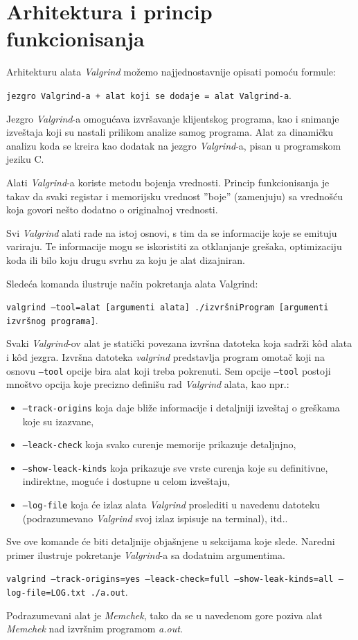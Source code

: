 \documentclass[12pt,oneside]{memoir}
\theoremstyle{plain}
\theoremstyle{definition}
\begin{document}
\section{Arhitektura i princip funkcionisanja}
Arhitekturu alata \textit{Valgrind} možemo najjednostavnije opisati pomoću formule:
\begin{center}
\texttt{jezgro Valgrind-a + alat koji se dodaje = alat Valgrind-a}.
\end{center}

Jezgro \textit{Valgrind}-a omogućava izvršavanje klijentskog programa, kao i snimanje izveštaja koji su nastali prilikom analize samog programa. Alat za dinamičku analizu koda se kreira kao dodatak na jezgro \textit{Valgrind}-a, pisan u programskom jeziku C.

Alati \textit{Valgrind}-a koriste metodu bojenja vrednosti. Princip funkcionisanja je takav da svaki registar i memorijsku vrednost ''boje'' (zamenjuju) sa vrednošću koja govori nešto dodatno o originalnoj vrednosti.

Svi \textit{Valgrind} alati rade na istoj osnovi, s tim da se informacije koje se emituju variraju. Te informacije mogu se iskoristiti za otklanjanje grešaka, optimizaciju koda ili bilo koju drugu svrhu za koju je alat dizajniran.

Sledeća komanda ilustruje način pokretanja alata Valgrind:
\begin{center}
\texttt{valgrind --tool=alat [argumenti alata] ./izvršniProgram [argumenti izvršnog programa]}.
\end{center}

Svaki \textit{Valgrind}-ov alat je statički povezana izvršna datoteka koja sadrži k\^od alata i k\^od jezgra. Izvršna datoteka \textit{valgrind} predstavlja program omotač koji na osnovu \texttt{--tool} opcije bira alat koji treba pokrenuti. Sem opcije \texttt{--tool} postoji mnoštvo opcija koje precizno definišu rad \textit{Valgrind} alata, kao npr.:
\begin{itemize}
\item \texttt{--track-origins} koja daje bliže informacije i detaljniji izveštaj o greškama koje su izazvane, 
\item \texttt{--leack-check} koja svako curenje memorije prikazuje detaljnjno,
\item \texttt{--show-leack-kinds} koja prikazuje sve vrste curenja koje su definitivne, indirektne, moguće i dostupne u celom izveštaju,
\item \texttt{--log-file}  koja će izlaz alata \textit{Valgrind} proslediti u navedenu datoteku (podrazumevano \textit{Valgrind} svoj izlaz ispisuje na terminal), itd.. 
\end{itemize} 
Sve ove komande će biti detaljnije objašnjene u sekcijama koje slede. Naredni primer ilustruje pokretanje \textit{Valgrind}-a sa dodatnim argumentima.
\begin{center}
\texttt{valgrind --track-origins=yes --leack-check=full --show-leak-kinds=all --log-file=LOG.txt ./a.out}.
\end{center}
Podrazumevani alat je \textit{Memchek}, tako da se u navedenom gore poziva alat \textit{Memchek} nad izvršnim programom \textit{a.out}.
\end{document}
